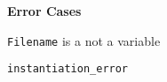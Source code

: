 \begin{description}
{\bf Error Cases}
\bi
\item {\tt Filename} is a not a variable
\bi
\item {\tt instantiation\_error}
\ei
\ei

%



\end{description}
